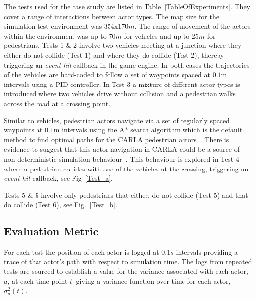 The tests used for the case study are listed in Table~\ref{TableOfExperiments}. They cover a range of interactions between actor types. The map size for the simulation test environment was 354x170$m$. The range of movement of the actors within the environment was up to 70$m$ for vehicles and up to 25$m$ for pedestrians.
%
Tests 1 \& 2 involve two vehicles meeting at a junction where they either do not collide (Test 1) and where they do collide (Test 2), thereby triggering an \textit{event hit} callback in the game engine. In both cases the trajectories of the vehicles are hard-coded to follow a set of waypoints spaced at $0.1$m intervals using a PID controller. 
%
In Test 3 a mixture of different actor types is introduced where two vehicles drive without collision and a pedestrian walks across the road at a crossing point. 

Similar to vehicles, pedestrian actors navigate via a set of regularly spaced waypoints at $0.1$m intervals using the A* search algorithm which is the default method to find optimal paths for the CARLA pedestrian actors~\cite{newton2016unreal}. 
%
There is evidence to suggest that this actor navigation in CARLA could be a source of non-deterministic simulation behaviour~\cite{CARLABenchmark}. 
%
This behaviour is explored in Test 4 where a pedestrian collides with one of the vehicles at the crossing, triggering an \textit{event hit} callback, see Fig~\ref{Test_a}.  
%

Tests 5 \& 6 involve only pedestrians that either, do not collide (Test 5) and that do collide (Test 6), see Fig.~\ref{Test_b}. 


\subsection{Evaluation Metric}\label{s:Experiment_Description}
For each test the position of each actor is logged at $0.1s$ intervals providing a trace of that actor's path with respect to simulation time. The logs from repeated tests are sourced to establish a value for the variance associated with each actor, $a$, at each time point $t$, giving a variance function over time for each actor, $\sigma_a^{2}(t)$.


